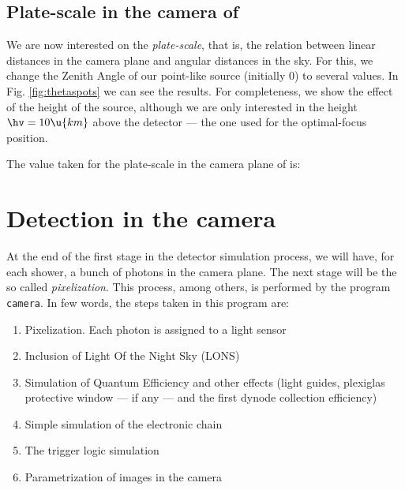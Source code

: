 \subsection{Plate-scale in the camera of \MAGIC}

We are now interested on the \emph{plate-scale}, that is, the relation
between linear distances in the camera plane and angular distances in
the sky. For this, we change the Zenith Angle of our point-like source
(initially 0\deg) to several values. In Fig. \ref{fig:thetaspots} we
can see the results. For completeness, we show the effect of the
height of the source, although we are only interested in the height
$\hv=10\u{km}$ above the detector --- the one used for the
optimal-focus position.

The value taken for the plate-scale in the camera plane of \MAGIC is:
%
\platescaleeq

\section{Detection in the camera}

At the end of the first stage in the detector simulation process, we
will have, for each shower, a bunch of photons in the camera plane.
The next stage will be the so called \emph{pixelization}.  This
process, among others, is performed by the program \texttt{camera}. In
few words, the steps taken in this program are:

\begin{enumerate}
\item Pixelization. Each photon is assigned to a light sensor
  
\item Inclusion of Light Of the Night Sky (LONS)
  
\item Simulation of Quantum Efficiency and other effects (light
  guides, plexiglas protective window --- if any --- and the first
  dynode collection efficiency)

\item Simple simulation of the electronic chain

\item The trigger logic simulation
  
\item Parametrization of images in the camera
\end{enumerate}

